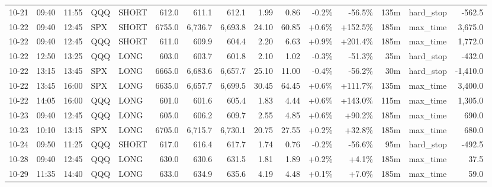 \documentclass[11pt,a4paper,twoside]{article}
\begin{document}
\begin{landscape}
\begin{center}
\begin{longtable}{>{\color{txtmain}}l l l l l r r r r r r r r >{\color{txtmain}}l r}
10-21 & 09:40 & 11:55 & QQQ & SHORT & 612.0 & 611.1 & 612.1 & 1.99 & 0.86 & \textcolor{lossred}{-0.2\%} & \textcolor{lossred}{-56.5\%} & 135m & hard\_stop & \textcolor{lossred}{-562.5} \\
10-22 & 09:40 & 12:45 & SPX & SHORT & 6755.0 & 6,736.7 & 6,693.8 & 24.10 & 60.85 & \textcolor{wingreen}{+0.6\%} & \textcolor{wingreen}{+152.5\%} & 185m & max\_time & \textcolor{wingreen}{3,675.0} \\
10-22 & 09:40 & 12:45 & QQQ & SHORT & 611.0 & 609.9 & 604.4 & 2.20 & 6.63 & \textcolor{wingreen}{+0.9\%} & \textcolor{wingreen}{+201.4\%} & 185m & max\_time & \textcolor{wingreen}{1,772.0} \\
10-22 & 12:50 & 13:25 & QQQ & LONG & 603.0 & 603.7 & 601.8 & 2.10 & 1.02 & \textcolor{lossred}{-0.3\%} & \textcolor{lossred}{-51.3\%} & 35m & hard\_stop & \textcolor{lossred}{-432.0} \\
10-22 & 13:15 & 13:45 & SPX & LONG & 6665.0 & 6,683.6 & 6,657.7 & 25.10 & 11.00 & \textcolor{lossred}{-0.4\%} & \textcolor{lossred}{-56.2\%} & 30m & hard\_stop & \textcolor{lossred}{-1,410.0} \\
10-22 & 13:45 & 16:00 & SPX & LONG & 6635.0 & 6,657.7 & 6,699.5 & 30.45 & 64.45 & \textcolor{wingreen}{+0.6\%} & \textcolor{wingreen}{+111.7\%} & 135m & max\_time & \textcolor{wingreen}{3,400.0} \\
10-22 & 14:05 & 16:00 & QQQ & LONG & 601.0 & 601.6 & 605.4 & 1.83 & 4.44 & \textcolor{wingreen}{+0.6\%} & \textcolor{wingreen}{+143.0\%} & 115m & max\_time & \textcolor{wingreen}{1,305.0} \\
10-23 & 09:40 & 12:45 & QQQ & LONG & 605.0 & 606.2 & 609.7 & 2.55 & 4.85 & \textcolor{wingreen}{+0.6\%} & \textcolor{wingreen}{+90.2\%} & 185m & max\_time & \textcolor{wingreen}{690.0} \\
10-23 & 10:10 & 13:15 & SPX & LONG & 6705.0 & 6,715.7 & 6,730.1 & 20.75 & 27.55 & \textcolor{wingreen}{+0.2\%} & \textcolor{wingreen}{+32.8\%} & 185m & max\_time & \textcolor{wingreen}{680.0} \\
10-24 & 09:50 & 11:25 & QQQ & SHORT & 617.0 & 616.4 & 617.7 & 1.74 & 0.76 & \textcolor{lossred}{-0.2\%} & \textcolor{lossred}{-56.6\%} & 95m & hard\_stop & \textcolor{lossred}{-492.5} \\
10-28 & 09:40 & 12:45 & QQQ & LONG & 630.0 & 630.6 & 631.5 & 1.81 & 1.89 & \textcolor{wingreen}{+0.2\%} & \textcolor{wingreen}{+4.1\%} & 185m & max\_time & \textcolor{wingreen}{37.5} \\
10-29 & 11:35 & 14:40 & QQQ & LONG & 633.0 & 634.9 & 635.6 & 4.19 & 4.48 & \textcolor{wingreen}{+0.1\%} & \textcolor{wingreen}{+7.0\%} & 185m & max\_time & \textcolor{wingreen}{59.0} \\

\end{longtable}
\end{center}
\end{landscape}
\end{document}
